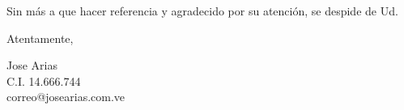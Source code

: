 \documentclass[paper=letter,oneside,fontsize=12pt, parskip=full]{article}
\begin{document}
	Sin más a que hacer referencia y agradecido por su atención, se despide de Ud.	
	
	\begin{flushright}
		Atentamente, 		
		
		\vspace{2cm}
		
		\begin{singlespace}
			\large
			Jose Arias \\
			{
				\small
				C.I. 14.666.744 \\
				correo@josearias.com.ve \\			
			}	
		\end{singlespace}
	
	\end{flushright}
\end{document}
